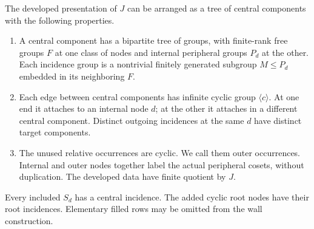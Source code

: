 \begin{lemma}\label{fan:components}
The developed presentation of $J$ can be arranged as a tree of central
components with the following properties.
\begin{enumerate}[label=\textup{(\roman*)}]
\item A central component has a bipartite tree of groups, with finite-rank
free groups $F$ at one class of nodes and internal peripheral groups
$P_d$ at the other.  Each incidence group is a nontrivial finitely
generated subgroup $M\le P_d$ embedded in its neighboring $F$.
\item Each edge between central components has infinite cyclic group
$\langle c\rangle$.  At one end it attaches to an internal node $d$;
at the other it attaches in a different central component.  Distinct
outgoing incidences at the same $d$ have distinct target components.
\item The unused relative occurrences are cyclic.  We call them outer
occurrences.  Internal and outer nodes together label the actual
peripheral cosets, without duplication.  The developed data have finite
quotient by $J$.
\end{enumerate}
Every included $S_d$ has a central incidence.  The added cyclic root
nodes have their root incidences.  Elementary filled rows may be omitted
from the wall construction.
\end{lemma}

